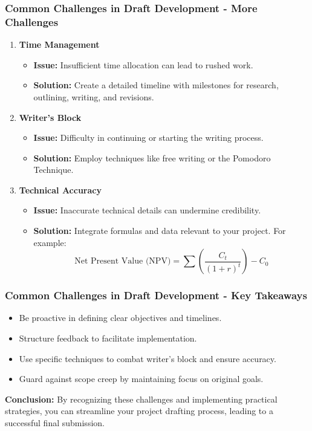 \documentclass[aspectratio=169]{beamer}
\begin{document}
\begin{frame}[fragile]
    \frametitle{Common Challenges in Draft Development - More Challenges}
    \begin{enumerate}[resume]
        \item \textbf{Time Management}
            \begin{itemize}
                \item \textbf{Issue:} Insufficient time allocation can lead to rushed work.
                \item \textbf{Solution:} Create a detailed timeline with milestones for research, outlining, writing, and revisions.
            \end{itemize}

        \item \textbf{Writer's Block}
            \begin{itemize}
                \item \textbf{Issue:} Difficulty in continuing or starting the writing process.
                \item \textbf{Solution:} Employ techniques like free writing or the Pomodoro Technique.
            \end{itemize}

        \item \textbf{Technical Accuracy}
            \begin{itemize}
                \item \textbf{Issue:} Inaccurate technical details can undermine credibility.
                \item \textbf{Solution:} Integrate formulas and data relevant to your project. For example:
                \begin{equation}
                    \text{Net Present Value (NPV)} = \sum \left( \frac{C_t}{(1+r)^t} \right) - C_0
                \end{equation}
            \end{itemize}
    \end{enumerate}
\end{frame}

\begin{frame}[fragile]
    \frametitle{Common Challenges in Draft Development - Key Takeaways}
    \begin{itemize}
        \item Be proactive in defining clear objectives and timelines.
        \item Structure feedback to facilitate implementation.
        \item Use specific techniques to combat writer's block and ensure accuracy.
        \item Guard against scope creep by maintaining focus on original goals.
    \end{itemize}

    \textbf{Conclusion:} By recognizing these challenges and implementing practical strategies, you can streamline your project drafting process, leading to a successful final submission.
\end{frame}
\end{document}
